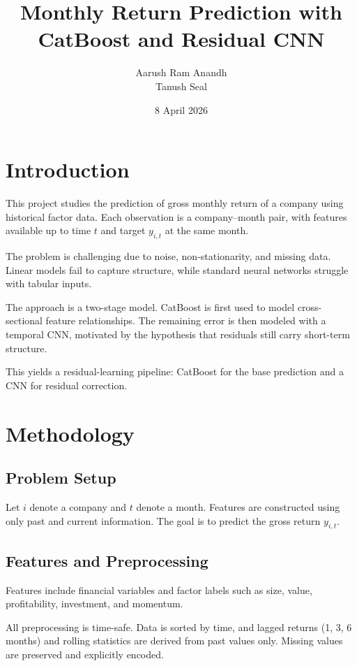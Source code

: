 \documentclass[11pt]{article}
\title{Monthly Return Prediction with CatBoost and Residual CNN}
\author{Aarush Ram Anandh \\ Tanush Seal}
\date{8 April 2026}
\begin{document}
\maketitle
\onehalfspacing
\setlength{\parindent}{0pt}
\setlength{\parskip}{0.4em}

\section{Introduction}

This project studies the prediction of gross monthly return of a company using historical factor data. Each observation is a company--month pair, with features available up to time $t$ and target $y_{i,t}$ at the same month.

The problem is challenging due to noise, non-stationarity, and missing data. Linear models fail to capture structure, while standard neural networks struggle with tabular inputs.

The approach is a two-stage model. CatBoost is first used to model cross-sectional feature relationships. The remaining error is then modeled with a temporal CNN, motivated by the hypothesis that residuals still carry short-term structure.

This yields a residual-learning pipeline: CatBoost for the base prediction and a CNN for residual correction.

\section{Methodology}

\subsection{Problem Setup}

Let $i$ denote a company and $t$ denote a month. Features are constructed using only past and current information. The goal is to predict the gross return $y_{i,t}$.

\subsection{Features and Preprocessing}

Features include financial variables and factor labels such as size, value, profitability, investment, and momentum.

All preprocessing is time-safe. Data is sorted by time, and lagged returns (1, 3, 6 months) and rolling statistics are derived from past values only. Missing values are preserved and explicitly encoded.
\end{document}
